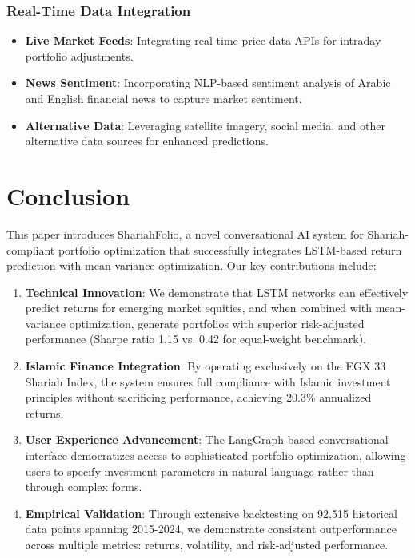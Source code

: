 \documentclass[conference]{IEEEtran}
\begin{document}
\subsubsection{Real-Time Data Integration}
\begin{itemize}
\item \textbf{Live Market Feeds}: Integrating real-time price data APIs for intraday portfolio adjustments.
\item \textbf{News Sentiment}: Incorporating NLP-based sentiment analysis of Arabic and English financial news to capture market sentiment.
\item \textbf{Alternative Data}: Leveraging satellite imagery, social media, and other alternative data sources for enhanced predictions.
\end{itemize}

\section{Conclusion}

This paper introduces ShariahFolio, a novel conversational AI system for Shariah-compliant portfolio optimization that successfully integrates LSTM-based return prediction with mean-variance optimization. Our key contributions include:

\begin{enumerate}
\item \textbf{Technical Innovation}: We demonstrate that LSTM networks can effectively predict returns for emerging market equities, and when combined with mean-variance optimization, generate portfolios with superior risk-adjusted performance (Sharpe ratio 1.15 vs. 0.42 for equal-weight benchmark).

\item \textbf{Islamic Finance Integration}: By operating exclusively on the EGX 33 Shariah Index, the system ensures full compliance with Islamic investment principles without sacrificing performance, achieving 20.3\% annualized returns.

\item \textbf{User Experience Advancement}: The LangGraph-based conversational interface democratizes access to sophisticated portfolio optimization, allowing users to specify investment parameters in natural language rather than through complex forms.

\item \textbf{Empirical Validation}: Through extensive backtesting on 92,515 historical data points spanning 2015-2024, we demonstrate consistent outperformance across multiple metrics: returns, volatility, and risk-adjusted performance.
\end{enumerate}
\end{document}
